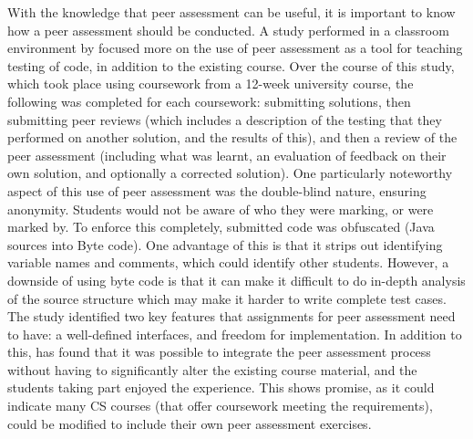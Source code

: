 \documentclass[sigplan,10pt,review]{acmart}\settopmatter{printfolios=true}
\begin{document}
With the knowledge that peer assessment can be useful, it is important
to know how a peer assessment should be conducted. A study performed
in a classroom environment by \citet{SmiTesKraLin_ICER-2012}
focused more on the use of peer assessment as a tool for teaching
testing of code, in addition to the existing course.
%
Over the course of this study, which took place using coursework from
a 12-week university course, the following was completed for each
coursework: submitting solutions, then submitting peer reviews (which
includes a description of the testing that they performed on another
solution, and the results of this), and then a review of the
peer assessment (including what was learnt, an evaluation of feedback
on their own solution, and optionally a corrected solution).
%
One particularly noteworthy aspect of this use of peer assessment was
the double-blind nature, ensuring anonymity. Students would not be
aware of who they were marking, or were marked by. To enforce this
completely, submitted code was obfuscated (Java sources into Byte
code). One advantage of this is that it strips out identifying
variable names and comments, which could identify other
students. However, a downside of using byte code is that it can make
it difficult to do in-depth analysis of the source structure which may
make it harder to write complete test cases.
%
The study identified two key features that assignments for
peer assessment need to have: a well-defined interfaces, and freedom
for implementation.  In addition to this,
\citet{SmiTesKraLin_ICER-2012} has found that it was possible to
integrate the peer assessment process without having to significantly
alter the existing course material, and the students taking part
enjoyed the experience. This shows promise, as it could indicate many
\ac{CS} courses (that offer coursework meeting the requirements),
could be modified to include their own peer assessment exercises.
\end{document}
